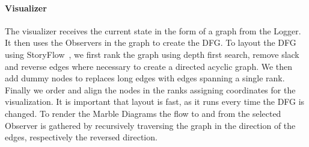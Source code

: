 \paragraph{Visualizer}
The visualizer receives the current state in the form of a graph from the Logger. It then uses the Observers in the graph to create the DFG. 
To layout the DFG using StoryFlow~\cite{liu2013storyflow}, we first rank the graph using depth first search, remove slack and reverse edges where necessary to create a directed acyclic graph. We then add dummy nodes to replaces long edges with edges spanning a single rank. Finally we order and align the nodes in the ranks assigning coordinates for the visualization. It is important that layout is fast, as it runs every time the DFG is changed. To render the Marble Diagrams the flow to and from the selected Observer is gathered by recursively traversing the graph in the direction of the edges, respectively the reversed direction.
